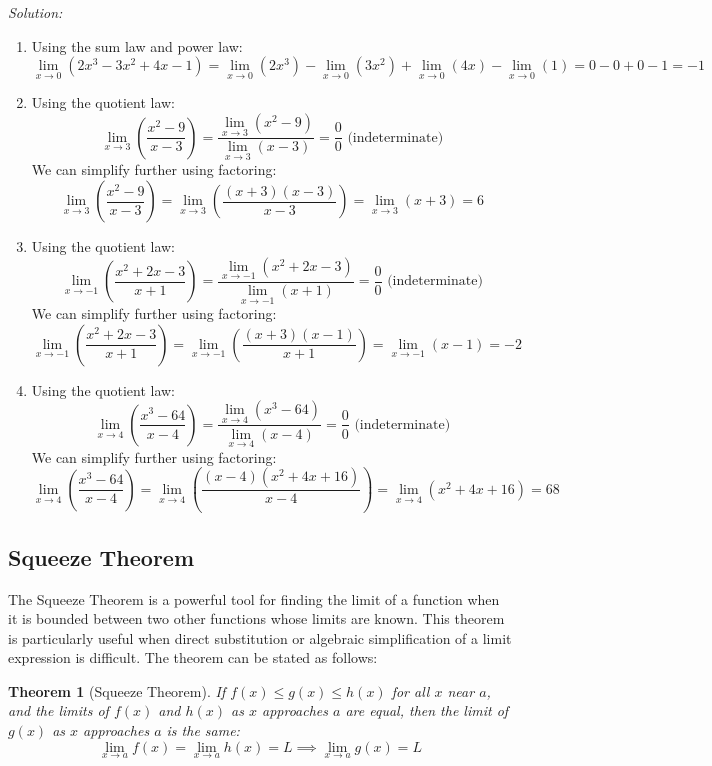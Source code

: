 \documentclass[a4paper,12pt]{book}
\newenvironment{solution}[1][]
{\par\noindent\textit{Solution:} \rmfamily}{\medskip}
\newtheorem{theorem}{Theorem}
\begin{document}
\begin{solution}
\begin{enumerate}[label=(\alph*)]
  \item Using the sum law and power law:
  \[
  \lim_{{x \to 0}} (2x^3 - 3x^2 + 4x - 1) = \lim_{{x \to 0}} (2x^3) - \lim_{{x \to 0}} (3x^2) + \lim_{{x \to 0}} (4x) - \lim_{{x \to 0}} (1) = 0 - 0 + 0 - 1 = -1
  \]
  
  \item Using the quotient law:
  \[
  \lim_{{x \to 3}} \left(\frac{x^2 - 9}{x - 3}\right) = \frac{\lim_{{x \to 3}} (x^2 - 9)}{\lim_{{x \to 3}} (x - 3)} = \frac{0}{0} \text{ (indeterminate)}
  \]
  We can simplify further using factoring:
  \[
  \lim_{{x \to 3}} \left(\frac{x^2 - 9}{x - 3}\right) = \lim_{{x \to 3}} \left(\frac{(x + 3)(x - 3)}{x - 3}\right) = \lim_{{x \to 3}} (x + 3) = 6
  \]
  
  \item Using the quotient law:
  \[
  \lim_{{x \to -1}} \left(\frac{x^2 + 2x - 3}{x + 1}\right) = \frac{\lim_{{x \to -1}} (x^2 + 2x - 3)}{\lim_{{x \to -1}} (x + 1)} = \frac{0}{0} \text{ (indeterminate)}
  \]
  We can simplify further using factoring:
  \[
  \lim_{{x \to -1}} \left(\frac{x^2 + 2x - 3}{x + 1}\right) = \lim_{{x \to -1}} \left(\frac{(x + 3)(x - 1)}{x + 1}\right) = \lim_{{x \to -1}} (x - 1) = -2
  \]
  
  \item Using the quotient law:
  \[
  \lim_{{x \to 4}} \left(\frac{x^3 - 64}{x - 4}\right) = \frac{\lim_{{x \to 4}} (x^3 - 64)}{\lim_{{x \to 4}} (x - 4)} = \frac{0}{0} \text{ (indeterminate)}
  \]
  We can simplify further using factoring:
  \[
  \lim_{{x \to 4}} \left(\frac{x^3 - 64}{x - 4}\right) = \lim_{{x \to 4}} \left(\frac{(x - 4)(x^2 + 4x + 16)}{x - 4}\right) = \lim_{{x \to 4}} (x^2 + 4x + 16) = 68
  \]
\end{enumerate}
\end{solution}

\subsection{Squeeze Theorem}

The Squeeze Theorem is a powerful tool for finding the limit of a function when it is bounded between two other functions whose limits are known. This theorem is particularly useful when direct substitution or algebraic simplification of a limit expression is difficult. The theorem can be stated as follows:

\begin{theorem}[Squeeze Theorem]
If \( f(x) \leq g(x) \leq h(x) \) for all \( x \) near \( a \), and the limits of \( f(x) \) and \( h(x) \) as \( x \) approaches \( a \) are equal, then the limit of \( g(x) \) as \( x \) approaches \( a \) is the same:
\[
\lim_{{x \to a}} f(x) = \lim_{{x \to a}} h(x) = L \implies \lim_{{x \to a}} g(x) = L
\]
\end{theorem}
\end{document}
